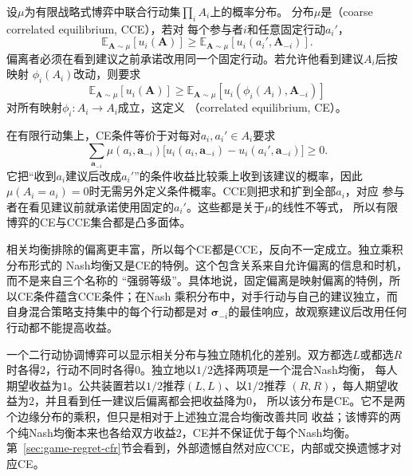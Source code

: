 \begin{definition}[粗相关均衡与相关均衡]
\label{def:game-coarse-correlated-equilibrium}
设$\mu$为有限战略式博弈中联合行动集$\prod_i A_i$上的概率分布。
分布\(\mu\)是（coarse correlated equilibrium, CCE），若对
每个参与者\(i\)和任意固定行动\(a_i'\)，
\begin{equation}
  \mathbb{E}_{\bm{A}\sim\mu}[u_i(\bm{A})]
  \geq
  \mathbb{E}_{\bm{A}\sim\mu}
  [u_i(a_i',\bm{A}_{-i})].
  \label{eq:game-cce}
\end{equation}
偏离者必须在看到建议之前承诺改用同一个固定行动。若允许他看到建议\(A_i\)后按映射
\(\phi_i(A_i)\)改动，则要求
\begin{equation}
  \mathbb{E}_{\bm{A}\sim\mu}[u_i(\bm{A})]
  \geq
  \mathbb{E}_{\bm{A}\sim\mu}
  [u_i(\phi_i(A_i),\bm{A}_{-i})]
  \label{eq:game-correlated-equilibrium}
\end{equation}
对所有映射\(\phi_i:A_i\to A_i\)成立，这定义
（correlated equilibrium, CE）。
\end{definition}

在有限行动集上，CE条件等价于对每对\(a_i,a_i'\in A_i\)要求
\begin{equation}
  \sum_{\bm{a}_{-i}}
  \mu(a_i,\bm{a}_{-i})
  \bigl[
    u_i(a_i,\bm{a}_{-i})
    -
    u_i(a_i',\bm{a}_{-i})
  \bigr]
  \geq0.
  \label{eq:game-ce-linear-constraints}
\end{equation}
它把“收到\(a_i\)建议后改成\(a_i'\)”的条件收益比较乘上收到该建议的概率，因此
\(\mu(A_i=a_i)=0\)时无需另外定义条件概率。CCE则把求和扩到全部\(a_i\)，对应
参与者在看见建议前就承诺使用固定的\(a_i'\)。这些都是关于\(\mu\)的线性不等式，
所以有限博弈的CE与CCE集合都是凸多面体。

相关均衡排除的偏离更丰富，所以每个CE都是CCE，反向不一定成立。独立乘积分布形式的
Nash均衡又是CE的特例。这个包含关系来自允许偏离的信息和时机，而不是来自三个名称的
“强弱等级”。具体地说，固定偏离是映射偏离的特例，所以CE条件蕴含CCE条件；在Nash
乘积分布中，对手行动与自己的建议独立，而自身混合策略支持集中的每个行动都是对
\(\bm{\sigma}_{-i}\)的最佳响应，故观察建议后改用任何行动都不能提高收益。

一个二行动协调博弈可以显示相关分布与独立随机化的差别。双方都选\(L\)或都选\(R\)
时各得\(2\)，行动不同时各得\(0\)。独立地以\(1/2\)选择两项是一个混合Nash均衡，
每人期望收益为\(1\)。公共装置若以\(1/2\)推荐\((L,L)\)、以\(1/2\)推荐
\((R,R)\)，每人期望收益为\(2\)，并且看到任一建议后偏离都会把收益降为\(0\)，
所以该分布是CE。它不是两个边缘分布的乘积，但只是相对于上述独立混合均衡改善共同
收益；该博弈的两个纯Nash均衡本来也各给双方收益\(2\)，CE并不保证优于每个Nash均衡。
第~\ref{sec:game-regret-cfr}节会看到，外部遗憾自然对应CCE，内部或交换遗憾才对应CE。

